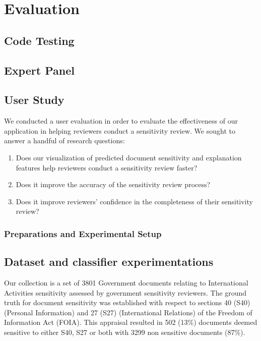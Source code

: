 \documentclass[\version]{l4proj}
\begin{document}
\chapter{Evaluation}


\section{Code Testing}

\section{Expert Panel}

\section{User Study}

We conducted a user evaluation in order to evaluate the effectiveness of our application in helping reviewers conduct a sensitivity review. We sought to answer a handful of research questions:

\begin{enumerate}[label=\textbf{RQ\arabic*}]
    \item Does our visualization of predicted document sensitivity and explanation features help reviewers conduct a sensitivity review faster?
    \item Does it improve the accuracy of the sensitivity review process?
    \item Does it improve reviewers' confidence in the completeness of their sensitivity review?
\end{enumerate}

\subsection{Preparations and Experimental Setup}

\section{Dataset and classifier experimentations}

Our collection is a set of 3801 Government documents relating to International Activities sensitivity assessed by government sensitivity reviewers.
The ground truth for document sensitivity was established with respect to sections 40 (S40) (Personal Information) and 27 (S27) (International Relations) of the Freedom of Information Act (FOIA).
This appraisal resulted in 502 (13\%) documents deemed sensitive to either S40, S27 or both with 3299 non sensitive documents (87\%).
\end{document}
